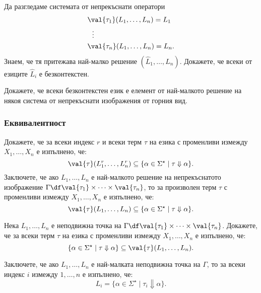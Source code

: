\begin{problem}
  Да разгледаме системата от непрекъснати оператори
  \begin{align*}
    & \val{\tau_1}(L_1,\dots,L_n) = L_1\\
    & \ \ \vdots\\
    & \val{\tau_n}(L_1,\dots,L_n) = L_n.
  \end{align*}
  Знаем, че тя притежава най-малко решение $(\hat{L}_1,\dots,\hat{L}_n)$.
  Докажете, че всеки от езиците $\hat{L}_i$ е безконтекстен.

  Докажете, че всеки безконтекстен език е елемент от най-малкото решение 
  на някоя система от непрекъснати изображения от горния вид.
\end{problem}


\subsubsection*{Еквивалентност}

\begin{problem}
  Докажете, че за всеки индекс $r$ и всеки терм $\tau$ на езика \CFG с променливи измежду $X_1,\dots,X_n$ е изпълнено, че:
  \[\val{\tau}(L^r_1,\dots,L^r_n) \subseteq \{\alpha \in \Sigma^\star \mid \tau \Downarrow \alpha\}.\]
  Заключете, че ако $L_1,\dots,L_n$ е най-малкото решение на непрекъснатото изображение $\Gamma \df \val{\tau_1}\times\cdots\times\val{\tau_n}$, то
  за произволен терм $\tau$ с променливи измежду $X_1,\dots,X_n$ е изпълнено, че:
  \[\val{\tau}(L_1,\dots,L_n) \subseteq \{\alpha \in \Sigma^\star \mid \tau \Downarrow \alpha\}.\]
\end{problem}

\begin{problem}
  Нека $L_1,\dots,L_n$ е неподвижна точка на $\Gamma \df \val{\tau_1}\times \cdots \times \val{\tau_n}$.
  Докажете, че за всеки терм $\tau$ на езика \CFG с променливи измежду $X_1,\dots,X_n$ е  изпълнено, че:
  \[\{\alpha \in \Sigma^\star \mid \tau \Downarrow \alpha\} \subseteq \val{\tau}(L_1,\dots,L_n).\]

  Заключете, че ако $L_1,\dots,L_n$ е най-малката неподвижна точка на $\Gamma$, то за всеки индекс $i$ измежду $1,\dots,n$ е изпълнено, че:
  \[L_i = \{\alpha \in \Sigma^\star \mid \tau_i \Downarrow \alpha\}.\]  
\end{problem}

